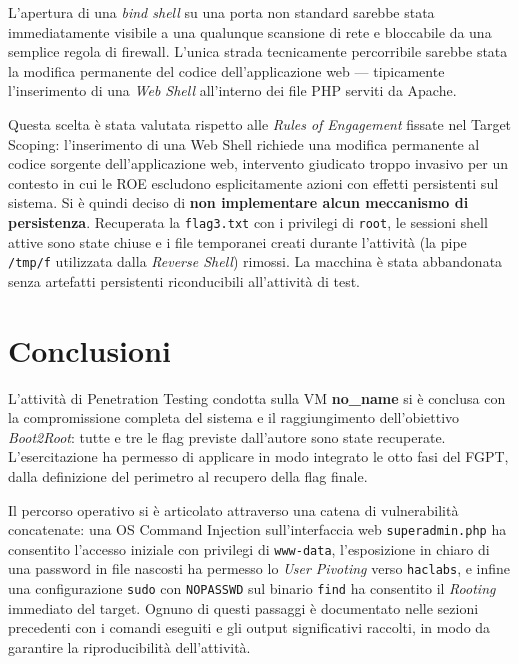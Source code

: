 \documentclass[11pt]{report}
\begin{document}
	L'apertura di una \textit{bind shell} su una porta non standard sarebbe stata immediatamente visibile a una qualunque scansione di rete e bloccabile da una semplice regola di firewall. L'unica strada tecnicamente percorribile sarebbe stata la modifica permanente del codice dell'applicazione web — tipicamente l'inserimento di una \textit{Web Shell} all'interno dei file PHP serviti da Apache.
	
	Questa scelta è stata valutata rispetto alle \textit{Rules of Engagement} fissate nel Target Scoping: l'inserimento di una Web Shell richiede una modifica permanente al codice sorgente dell'applicazione web, intervento giudicato troppo invasivo per un contesto in cui le ROE escludono esplicitamente azioni con effetti persistenti sul sistema. Si è quindi deciso di \textbf{non implementare alcun meccanismo di persistenza}.
	Recuperata la \texttt{flag3.txt} con i privilegi di \texttt{root}, le sessioni shell attive sono state chiuse e i file temporanei creati durante l'attività (la pipe \texttt{/tmp/f} utilizzata dalla \textit{Reverse Shell}) rimossi. La macchina è stata abbandonata senza artefatti persistenti riconducibili all'attività di test.
	
	
	\chapter{Conclusioni}
	L'attività di Penetration Testing condotta sulla VM \textbf{no\_name} si è conclusa con la compromissione completa del sistema e il raggiungimento dell'obiettivo \textit{Boot2Root}: tutte e tre le flag previste dall'autore sono state recuperate. L'esercitazione ha permesso di applicare in modo integrato le otto fasi del FGPT, dalla definizione del perimetro al recupero della flag finale.
	
	Il percorso operativo si è articolato attraverso una catena di vulnerabilità concatenate: una OS Command Injection sull'interfaccia web \texttt{superadmin.php} ha consentito l'accesso iniziale con privilegi di \texttt{www-data}, l'esposizione in chiaro di una password in file nascosti ha permesso lo \textit{User Pivoting} verso \texttt{haclabs}, e infine una configurazione \texttt{sudo} con \texttt{NOPASSWD} sul binario \texttt{find} ha consentito il \textit{Rooting} immediato del target. Ognuno di questi passaggi è documentato nelle sezioni precedenti con i comandi eseguiti e gli output significativi raccolti, in modo da garantire la riproducibilità dell'attività.
	
\end{document}
